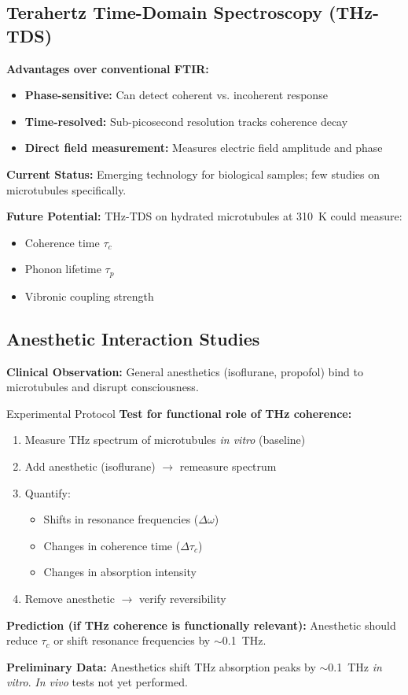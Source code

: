 \subsection{Terahertz Time-Domain Spectroscopy (THz-TDS)}
\label{subsec:app-thz-tds}

\textbf{Advantages over conventional FTIR:}
\begin{itemize}
\item \textbf{Phase-sensitive:} Can detect coherent vs. incoherent response
\item \textbf{Time-resolved:} Sub-picosecond resolution tracks coherence decay
\item \textbf{Direct field measurement:} Measures electric field amplitude and phase
\end{itemize}

\textbf{Current Status:} Emerging technology for biological samples; few studies on microtubules specifically.

\textbf{Future Potential:} THz-TDS on hydrated microtubules at 310~K could measure:
\begin{itemize}
\item Coherence time $\tau_c$
\item Phonon lifetime $\tau_p$  
\item Vibronic coupling strength
\end{itemize}

\subsection{Anesthetic Interaction Studies}
\label{subsec:app-anesthetics}

\textbf{Clinical Observation:} General anesthetics (isoflurane, propofol) bind to microtubules and disrupt consciousness.

\begin{calloutbox}{Experimental Protocol}
\textbf{Test for functional role of THz coherence:}

\begin{enumerate}
\item Measure THz spectrum of microtubules \textit{in vitro} (baseline)
\item Add anesthetic (isoflurane) $\rightarrow$ remeasure spectrum
\item Quantify:
  \begin{itemize}
  \item Shifts in resonance frequencies ($\Delta\omega$)
  \item Changes in coherence time ($\Delta\tau_c$)
  \item Changes in absorption intensity
  \end{itemize}
\item Remove anesthetic $\rightarrow$ verify reversibility
\end{enumerate}

\textbf{Prediction (if THz coherence is functionally relevant):} Anesthetic should reduce $\tau_c$ or shift resonance frequencies by $\sim$0.1~THz.

\textbf{Preliminary Data:} Anesthetics shift THz absorption peaks by $\sim$0.1~THz \textit{in vitro}. \textit{In vivo} tests not yet performed.
\end{calloutbox}

